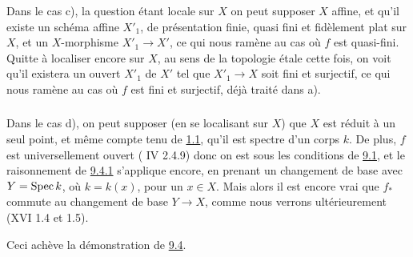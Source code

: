 \documentclass[10pt]{../fichiers-configuration-latex/smfart}
\begin{document}
\subsubsection{}

Dans le cas c), la question étant locale sur $X$ on peut supposer $X$
affine, et qu'il existe un schéma affine $X'_{1}$, de présentation
finie, quasi fini et fidèlement plat sur $X$, et un $X$-morphisme
$X'_{1}\rightarrow X'$, ce qui nous ramène au cas où $f$ est
quasi-fini. Quitte à localiser encore sur $X$, au sens de la topologie
étale cette fois, on voit qu'il existera un ouvert $X'_{1}$ de $X'$
tel que $X'_{1}\rightarrow X$ soit fini et surjectif, ce qui nous
ramène au cas où $f$ est fini et surjectif, déjà traité dans a).

\subsubsection{}
Dans le cas d), on peut supposer (en se localisant sur $X$) que $X$
est réduit à un seul point, et même compte tenu de \hyperref[VIII.thm1.1]{1.1}, qu'il est
spectre d'un corps $k$. De plus, $f$ est universellement ouvert (\EGA
IV 2.4.9) donc on est sous les conditions de \hyperref[VIII.prop9.1]{9.1}, et le raisonnement
de \hyperref[VIII.subsubsec9.4.1]{9.4.1} s'applique encore, en prenant un changement de base avec
$Y=\operatorname{Spec} k$, où $k=k(x)$, pour un $x\in X$. Mais alors il est encore
vrai que $f_{\ast}$ commute au changement de base $Y\rightarrow X$,
comme nous verrons ultérieurement (XVI 1.4 et 1.5).

Ceci achève la démonstration de \hyperref[VIII.thm9.4]{9.4}.


\ifx\danslelivre\undefined
\end{document}
